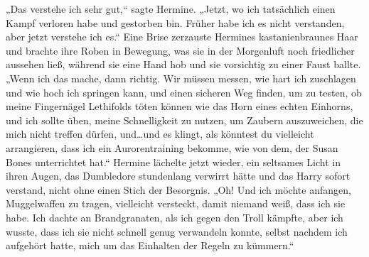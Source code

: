 „Das verstehe ich sehr gut,“ sagte Hermine. „Jetzt, wo ich tatsächlich einen Kampf verloren habe und gestorben bin. Früher habe ich es nicht verstanden, aber jetzt verstehe ich es.“
Eine Brise zerzauste Hermines kastanienbraunes Haar und brachte ihre Roben in Bewegung, was sie in der Morgenluft noch friedlicher aussehen ließ, während sie eine Hand hob und sie vorsichtig zu einer Faust ballte.
„Wenn ich das mache, dann richtig. Wir müssen messen, wie hart ich zuschlagen und wie hoch ich springen kann, und einen sicheren Weg finden, um zu testen, ob meine Fingernägel Lethifolds töten können wie das Horn eines echten Einhorns, und ich sollte üben, meine Schnelligkeit zu nutzen, um Zaubern auszuweichen, die mich nicht treffen dürfen, und…und es klingt, als könntest du vielleicht arrangieren, dass ich ein Aurorentraining bekomme, wie von dem, der Susan Bones unterrichtet hat.“
Hermine lächelte jetzt wieder, ein seltsames Licht in ihren Augen, das Dumbledore stundenlang verwirrt hätte und das Harry sofort verstand, nicht ohne einen Stich der Besorgnis.
„Oh! Und ich möchte anfangen, Muggelwaffen zu tragen, vielleicht versteckt, damit niemand weiß, dass ich sie habe. Ich dachte an Brandgranaten, als ich gegen den Troll kämpfte, aber ich wusste, dass ich sie nicht schnell genug verwandeln konnte, selbst nachdem ich aufgehört hatte, mich um das Einhalten der Regeln zu kümmern.“

